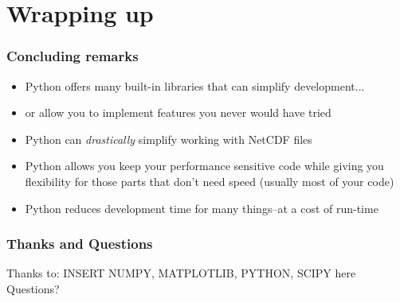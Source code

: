 \documentclass[red, hyperref={pdfpagelabels=false}]{beamer}
\begin{document}
\section{Wrapping up}
\begin{frame}
  \frametitle{Concluding remarks}
  \begin{itemize}
    \item Python offers many built-in libraries that can simplify development...
    \item or allow you to implement features you never would have tried
    \item Python can \emph{drastically} simplify working with NetCDF files
    \item Python allows you keep your performance sensitive code while giving you
      flexibility for those parts that don't need speed (usually most of your code)
    \item Python reduces development time for many things--at a cost of run-time
  \end{itemize}
\end{frame}

\begin{frame}
  \frametitle{Thanks and Questions}
  Thanks to:
  INSERT NUMPY, MATPLOTLIB, PYTHON, SCIPY here
  Questions?
\end{frame}
\end{document}
